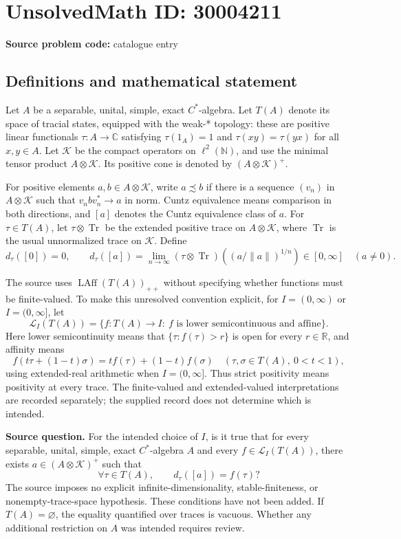 \documentclass[11pt]{article}
\newcommand{\N}{\mathbb{N}}
\newcommand{\R}{\mathbb{R}}
\newcommand{\C}{\mathbb{C}}
\begin{document}
\section*{UnsolvedMath ID: 30004211}
\textbf{Source problem code:} catalogue entry
\subsection{Definitions and mathematical statement}
Let \(A\) be a separable, unital, simple, exact \(C^*\)-algebra. Let \(T(A)\) denote its space of tracial states, equipped with the weak-* topology: these are positive linear functionals \(\tau:A\to\C\) satisfying \(\tau(1_A)=1\) and \(\tau(xy)=\tau(yx)\) for all \(x,y\in A\). Let \(\mathcal K\) be the compact operators on \(\ell^2(\N)\), and use the minimal tensor product \(A\otimes\mathcal K\). Its positive cone is denoted by \((A\otimes\mathcal K)^+\).

For positive elements \(a,b\in A\otimes\mathcal K\), write \(a\precsim b\) if there is a sequence \((v_n)\) in \(A\otimes\mathcal K\) such that \(v_n b v_n^*\to a\) in norm. Cuntz equivalence means comparison in both directions, and \([a]\) denotes the Cuntz equivalence class of \(a\). For \(\tau\in T(A)\), let \(\tau\otimes\operatorname{Tr}\) be the extended positive trace on \(A\otimes\mathcal K\), where \(\operatorname{Tr}\) is the usual unnormalized trace on \(\mathcal K\). Define
\[
 d_\tau([0])=0,\qquad
 d_\tau([a])=\lim_{n\to\infty}(\tau\otimes\operatorname{Tr})\!\left((a/\lVert a\rVert)^{1/n}\right)\in[0,\infty]
 \quad(a\ne0).
\]

The source uses \(\operatorname{LAff}(T(A))_{++}\) without specifying whether functions must be finite-valued. To make this unresolved convention explicit, for \(I=(0,\infty)\) or \(I=(0,\infty]\), let
\[
 \mathcal L_I(T(A))=\{f:T(A)\to I:\ f\text{ is lower semicontinuous and affine}\}.
\]
Here lower semicontinuity means that \(\{\tau:f(\tau)>r\}\) is open for every \(r\in\R\), and affinity means
\[
 f(t\tau+(1-t)\sigma)=t f(\tau)+(1-t)f(\sigma)
 \quad(\tau,\sigma\in T(A),\ 0<t<1),
\]
using extended-real arithmetic when \(I=(0,\infty]\). Thus strict positivity means positivity at every trace. The finite-valued and extended-valued interpretations are recorded separately; the supplied record does not determine which is intended.

\textbf{Source question.} For the intended choice of \(I\), is it true that for every separable, unital, simple, exact \(C^*\)-algebra \(A\) and every \(f\in\mathcal L_I(T(A))\), there exists \(a\in(A\otimes\mathcal K)^+\) such that
\[
 \forall\tau\in T(A),\qquad d_\tau([a])=f(\tau)?
\]
The source imposes no explicit infinite-dimensionality, stable-finiteness, or nonempty-trace-space hypothesis. These conditions have not been added. If \(T(A)=\varnothing\), the equality quantified over traces is vacuous. Whether any additional restriction on \(A\) was intended requires review.
\end{document}
